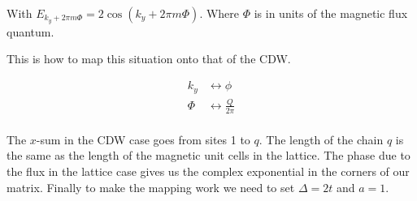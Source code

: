 \documentclass[letterpaper, 10 pt, conference]{ieeeconf}  %
\begin{document}
With $E_{k_{y}+2\pi m\Phi}=2\cos(k_{y}+2\pi m\Phi)$. Where $\Phi$ is in units of the magnetic flux quantum.

This is how to map this situation onto that of the CDW.

\begin{align*}
k_{y} &\leftrightarrow \phi  \\
\Phi &\leftrightarrow \frac{Q}{2\pi} \\
\end{align*}

The $x$-sum in the CDW case goes from sites 1 to $q$.
The length of the chain $q$ is the same as the length of the magnetic unit cells in the lattice.
The phase due to the flux in the lattice case gives us the complex exponential in the corners of our matrix.
Finally to make the mapping work we need to set $\Delta = 2t$ and $a=1$.
\end{document}
